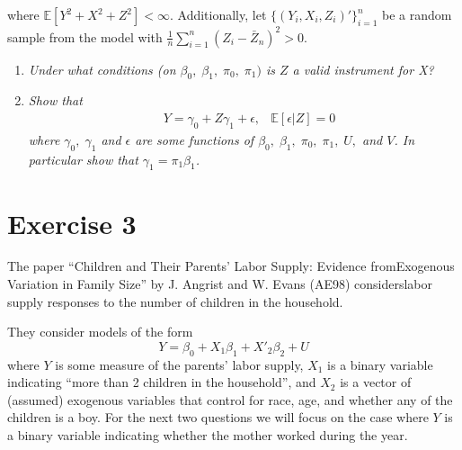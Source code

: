 \documentclass[12pt,oneside,reqno]{amsart}
\newcommand{\E}{\mathbb{E}}
\newcommand{\sumin}{\sum\limits_{i=1}^n} %
\begin{document}
where $\E[Y^2 +X^2+Z^2]<\infty$. Additionally, let $\{(Y_i,X_i,Z_i)'\}_{i=1}^n$ be a random sample from the model with $\frac{1}{n}\sumin (Z_i-\bar{Z}_n)^2>0$. 


\begin{enumerate}[label = (\roman*)]

\item \textit{Under what conditions (on $\beta_0,\;\beta_1,\;\pi_0,\;\pi_1)$ is $Z$ a valid instrument for X?}


\item \textit{Show that}
\begin{align*}
& Y = \gamma_0 +Z\gamma_1 +\epsilon, 
& \E[\epsilon|Z] = 0
\end{align*}
\textit{where $\gamma_0,\;\gamma_1$ and $\epsilon$ are some functions of $\beta_0,\;\beta_1,\;\pi_0,\;\pi_1,\; U,$ and $V$. In particular show that $\gamma_1 = \pi_1\beta_1$.}








\end{enumerate}



\section*{Exercise 3}

The paper “Children and Their Parents’ Labor Supply: Evidence fromExogenous Variation in Family Size” by J. Angrist and W. Evans (AE98) considerslabor supply responses to the number of children in the household. 

They consider models of the form
\[Y = \beta_0 +X_1\beta_1+X'_2\beta_2 +U \]
where $Y$ is some measure of the parents’ labor supply, $X_1$ is a binary variable indicating “more than 2 children in the household”, and $X_2$ is a vector of (assumed) exogenous variables that control for race, age, and whether any of the children is a boy. For the next two questions we will focus on the case where $Y$ is a binary variable indicating whether the mother worked during the year.
\end{document}
